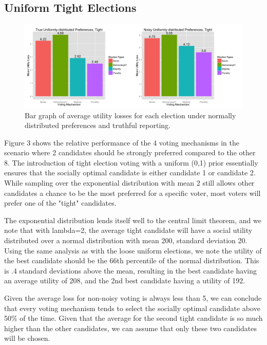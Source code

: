 \documentclass[11pt]{scrartcl}
\begin{document}
\subsection{Uniform Tight Elections}

\begin{figure}[H]\center
\includegraphics[scale=0.38]{uniform_tight_noisy.png}
\caption{Bar graph of average utility losses for each election under normally distributed preferences and truthful reporting.}
\end{figure}

Figure 3 shows the relative performance of the 4 voting mechanisms in the scenario where 2 candidates should be strongly preferred compared to the other 8. The introduction of tight election voting with a uniform (0,1) prior essentially ensures that the socially optimal candidate is either candidate 1 or candidate 2. While sampling over the exponential distribution with mean 2 still allows other candidates a chance to be the most preferred for a specific voter, most voters will prefer one of the "tight" candidates.

The exponential distribution lends itself well to the central limit theorem, and we note that with lambda=2, the average tight candidate will have a social utility distributed over a normal distribution with mean 200, standard deviation 20. Using the same analysis as with the loose uniform elections, we note the utility of the best candidate should be the $66$th percentile of the normal distribution. This is .4 standard deviations above the mean, resulting in the best candidate having an average utility of 208, and the 2nd best candidate having a utility of 192.

Given the average loss for non-noisy voting is always less than 5, we can conclude that every voting mechanism tends to select the socially optimal candidate above 50\% of the time. Given that the average for the second tight candidate is so much higher than the other candidates, we can assume that only these two candidates will be chosen.
\end{document}
